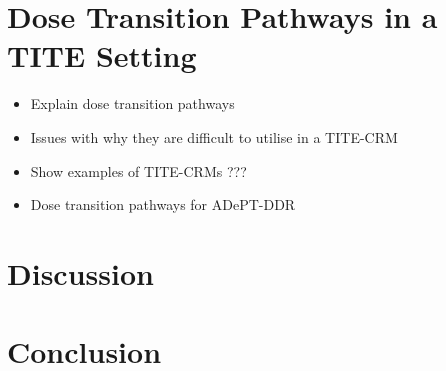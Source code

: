 
\section{Dose Transition Pathways in a TITE Setting}  
\label{section2.5}%

\begin{itemize}
	\item Explain dose transition pathways 
	\item Issues with why they are difficult to utilise in a TITE-CRM 
	\item Show examples of TITE-CRMs ???
	\item Dose transition pathways for ADePT-DDR 
\end{itemize}







\section{Discussion}  
\label{section2.6}%


\section{Conclusion}  
\label{section2.7}%
